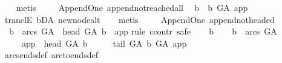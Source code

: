 \begin{isabellebody}
\ \ \isamarkupfalse%
\ metis%
\endisatagproof
{\isafoldproof}%
%
\isadelimproof
\ \ \isanewline
%
\endisadelimproof
\isanewline
\isanewline
{}\isamarkupfalse%
\ {\isacharparenleft}{\kern0pt}\ Append{\isacharunderscore}{\kern0pt}One{\isacharparenright}{\kern0pt}\ append{\isacharunderscore}{\kern0pt}not{\isacharunderscore}{\kern0pt}reached{\isacharunderscore}{\kern0pt}all{\isacharcolon}{\kern0pt}\isanewline
\ \ {\isachardoublequoteopen}{\isasymforall}b{\isachardot}{\kern0pt}\ {\isasymnot}\ b\ {\isasymrightarrow}\isactrlsup {\isacharplus}{\kern0pt}\isactrlbsub G{\isacharunderscore}{\kern0pt}A\isactrlesub \ app{\isachardoublequoteclose}\isanewline
%
\isadelimproof
\ \ %
\endisadelimproof
%
\isatagproof
{}\isamarkupfalse%
\ tranclE\ bD{\isacharunderscore}{\kern0pt}A\ new{\isacharunderscore}{\kern0pt}node{\isacharunderscore}{\kern0pt}alt\isanewline
\ \ \isamarkupfalse%
\ metis%
\endisatagproof
{\isafoldproof}%
%
\isadelimproof
\ \ \isanewline
%
\endisadelimproof
\isanewline
\isanewline
{}\isamarkupfalse%
\ {\isacharparenleft}{\kern0pt}\ Append{\isacharunderscore}{\kern0pt}One{\isacharparenright}{\kern0pt}\ append{\isacharunderscore}{\kern0pt}not{\isacharunderscore}{\kern0pt}headed{\isacharcolon}{\kern0pt}\isanewline
\ \ {\isachardoublequoteopen}{\isasymforall}b\ {\isasymin}\ arcs\ G{\isacharunderscore}{\kern0pt}A{\isachardot}{\kern0pt}\ {\isasymnot}\ head\ G{\isacharunderscore}{\kern0pt}A\ b\ {\isacharequal}{\kern0pt}\ app{\isachardoublequoteclose}\isanewline
%
\isadelimproof
%
\endisadelimproof
%
\isatagproof
{}\isamarkupfalse%
{\isacharparenleft}{\kern0pt}rule\ ccontr{\isacharcomma}{\kern0pt}\ safe{\isacharparenright}{\kern0pt}\isanewline
\ \ \isamarkupfalse%
\ b\isanewline
\ \ \isamarkupfalse%
\ {\isachardoublequoteopen}b\ {\isasymin}\ arcs\ G{\isacharunderscore}{\kern0pt}A{\isachardoublequoteclose}\isanewline
\ \ \ \ \ {\isachardoublequoteopen}app\ {\isacharequal}{\kern0pt}\ head\ G{\isacharunderscore}{\kern0pt}A\ b{\isachardoublequoteclose}\isanewline
\ \ \isamarkupfalse%
\ \isamarkupfalse%
\ {\isachardoublequoteopen}tail\ G{\isacharunderscore}{\kern0pt}A\ b\ {\isasymrightarrow}\isactrlbsub G{\isacharunderscore}{\kern0pt}A\isactrlesub \ app{\isachardoublequoteclose}\isanewline
\ \ \ \ \isamarkupfalse%
\ arcs{\isacharunderscore}{\kern0pt}ends{\isacharunderscore}{\kern0pt}def\ arc{\isacharunderscore}{\kern0pt}to{\isacharunderscore}{\kern0pt}ends{\isacharunderscore}{\kern0pt}def\isanewline

\end{isabellebody}
